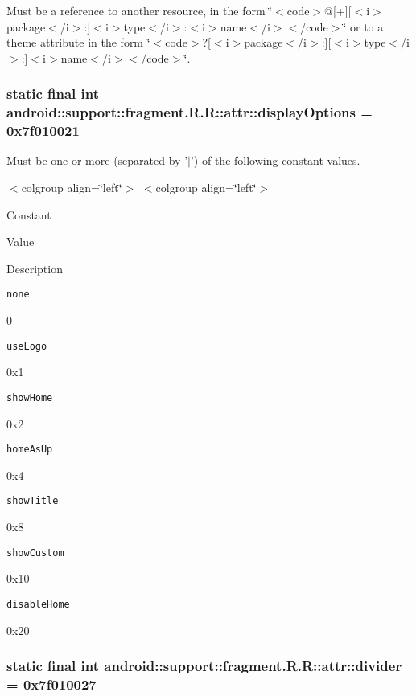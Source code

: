 Must be a reference to another resource, in the form \char`\"{}$<$code$>$@\mbox{[}+\mbox{]}\mbox{[}$<$i$>$package$<$/i$>$:\mbox{]}$<$i$>$type$<$/i$>$:$<$i$>$name$<$/i$>$$<$/code$>$\char`\"{} or to a theme attribute in the form \char`\"{}$<$code$>$?\mbox{[}$<$i$>$package$<$/i$>$:\mbox{]}\mbox{[}$<$i$>$type$<$/i$>$:\mbox{]}$<$i$>$name$<$/i$>$$<$/code$>$\char`\"{}. \hypertarget{classandroid_1_1support_1_1fragment_1_1_r_1_1attr_af60a810f1a4777bc2652ba0e066cc38}{
\subsubsection[{displayOptions}]{\setlength{\rightskip}{0pt plus 5cm}static final int android::support::fragment.R.R::attr::displayOptions = 0x7f010021}}
\label{classandroid_1_1support_1_1fragment_1_1_r_1_1attr_af60a810f1a4777bc2652ba0e066cc38}


Must be one or more (separated by '$|$') of the following constant values. \begin{TabularC}{0}
\hline
\end{TabularC}
$<$colgroup align=\char`\"{}left\char`\"{}$>$ $<$colgroup align=\char`\"{}left\char`\"{}$>$ 

Constant

Value

Description 

{\tt none}

0

{\tt useLogo}

0x1

{\tt showHome}

0x2

{\tt homeAsUp}

0x4

{\tt showTitle}

0x8

{\tt showCustom}

0x10

{\tt disableHome}

0x20\hypertarget{classandroid_1_1support_1_1fragment_1_1_r_1_1attr_24660e3fb53d137d8afa37088b5579a0}{
\subsubsection[{divider}]{\setlength{\rightskip}{0pt plus 5cm}static final int android::support::fragment.R.R::attr::divider = 0x7f010027}}
\label{classandroid_1_1support_1_1fragment_1_1_r_1_1attr_24660e3fb53d137d8afa37088b5579a0}


